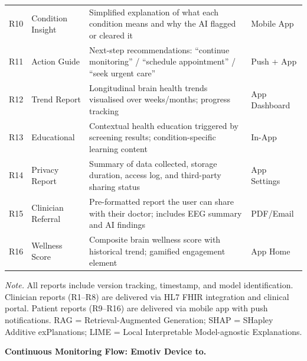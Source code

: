 {\begin{xltabular}{\textwidth}{@{} >{\raggedright\arraybackslash}p{1.0cm} >{\raggedright\arraybackslash}p{3.4cm} p{8.3cm} >{\raggedright\arraybackslash}p{1.5cm} @{}}
\addlinespace
R10 & Condition Insight & Simplified explanation of what each condition means and why the AI flagged or cleared it & Mobile App \\
\addlinespace
R11 & Action Guide & Next-step recommendations: ``continue monitoring'' / ``schedule appointment'' / ``seek urgent care'' & Push + App \\
\addlinespace
R12 & Trend Report & Longitudinal brain health trends visualised over weeks/months; progress tracking & App Dashboard \\
\addlinespace
R13 & Educational & Contextual health education triggered by screening results; condition-specific learning content & In-App \\
\addlinespace
R14 & Privacy Report & Summary of data collected, storage duration, access log, and third-party sharing status & App Settings \\
\addlinespace
R15 & Clinician Referral & Pre-formatted report the user can share with their doctor; includes EEG summary and AI findings & PDF/Email \\
\addlinespace
R16 & Wellness Score & Composite brain wellness score with historical trend; gamified engagement element & App Home \\
\end{xltabular}}
\vspace{0.5em}
\noindent\textit{Note.} All reports include version tracking, timestamp, and model identification. Clinician reports (R1--R8) are delivered via HL7 FHIR integration and clinical portal. Patient reports (R9--R16) are delivered via mobile app with push notifications. RAG = Retrieval-Augmented Generation; SHAP = SHapley Additive exPlanations; LIME = Local Interpretable Model-agnostic Explanations.
\fi %

\label{tab:report_types}




\noindent\textbf{Continuous Monitoring Flow: Emotiv Device to.}

